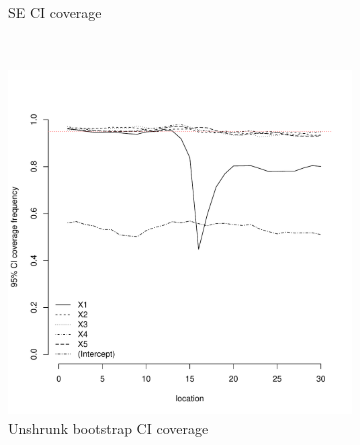 \documentclass[authoryear, review, 11pt]{elsarticle}
\begin{document}
\begin{figure}
\begin{subfigure}[b]{0.45\textwidth}
		\caption{SE CI coverage}
	\end{subfigure}%
	\\%
	\begin{subfigure}[b]{0.45\textwidth}
	\centering
		\includegraphics[width=\textwidth]{../../figures/simulation/15.9.profile_unshrunk_bootstrap_coverage.pdf}
		\caption{Unshrunk bootstrap CI coverage}
	\end{subfigure}%
	~ %
	\begin{subfigure}[b]{0.45\textwidth}
	\centering

\end{subfigure}
\end{figure}
\end{document}
